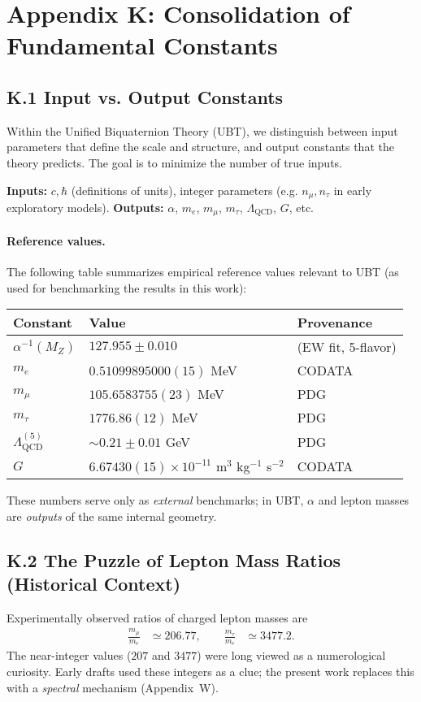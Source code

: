
\appendix
\section*{Appendix K: Consolidation of Fundamental Constants}

\subsection*{K.1 Input vs. Output Constants}
Within the Unified Biquaternion Theory (UBT), we distinguish between input parameters that define the scale and structure, and output constants that the theory predicts. 
The goal is to minimize the number of true inputs.

\textbf{Inputs:} $c, \hbar$ (definitions of units), integer parameters (e.g. $n_\mu, n_\tau$ in early exploratory models).  
\textbf{Outputs:} $\alpha$, $m_e$, $m_\mu$, $m_\tau$, $\Lambda_{\text{QCD}}$, $G$, etc.

\paragraph{Reference values.}  
The following table summarizes empirical reference values relevant to UBT (as used for benchmarking the results in this work):

\begin{center}
\begin{tabular}{lll}
\hline
Constant & Value & Provenance \\
\hline
$\alpha^{-1}(M_Z)$ & $127.955 \pm 0.010$ & (EW fit, 5-flavor) \\
$m_e$ & $0.51099895000(15)$ MeV & CODATA \\
$m_\mu$ & $105.6583755(23)$ MeV & PDG \\
$m_\tau$ & $1776.86(12)$ MeV & PDG \\
$\Lambda_{\text{QCD}}^{(5)}$ & $\sim 0.21 \pm 0.01$ GeV & PDG \\
$G$ & $6.67430(15)\times 10^{-11}$ m$^3$ kg$^{-1}$ s$^{-2}$ & CODATA \\
\hline
\end{tabular}
\end{center}

These numbers serve only as \emph{external} benchmarks; in UBT, $\alpha$ and lepton masses are \emph{outputs} of the same internal geometry.

\subsection*{K.2 The Puzzle of Lepton Mass Ratios (Historical Context)}
Experimentally observed ratios of charged lepton masses are
\begin{align*}
\frac{m_\mu}{m_e} &\simeq 206.77, \qquad
\frac{m_\tau}{m_e} &\simeq 3477.2.
\end{align*}
The near-integer values ($207$ and $3477$) were long viewed as a numerological curiosity. 
Early drafts used these integers as a clue; the present work replaces this with a \emph{spectral} mechanism (Appendix~W).

